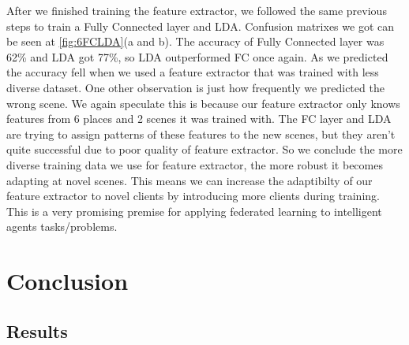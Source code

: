 \documentclass[11pt]{article}
\begin{document}
After we finished training the feature extractor, we followed the same previous steps to train a Fully Connected layer and LDA. Confusion matrixes we got can be seen at \ref{fig:6FCLDA}{(a and b)}. The accuracy of Fully Connected layer was 62\% and LDA got 77\%, so LDA outperformed FC once again. As we predicted the accuracy fell when we used a feature extractor that was trained with less diverse dataset. One other observation is just how frequently we predicted the wrong scene. We again speculate this is because our feature extractor only knows features from 6 places and 2 scenes it was trained with. The FC layer and LDA are trying to assign patterns of these features to the new scenes, but they aren’t quite successful due to poor quality of feature extractor. So we conclude the more diverse training data we use for feature extractor, the more robust it becomes adapting at novel scenes. This means we can increase the adaptibilty of our feature extractor to novel clients by introducing more clients during training. This is a very promising premise for applying federated learning to intelligent agents tasks/problems.


\pagebreak

\section{Conclusion}
\subsection{Results}
\end{document}
